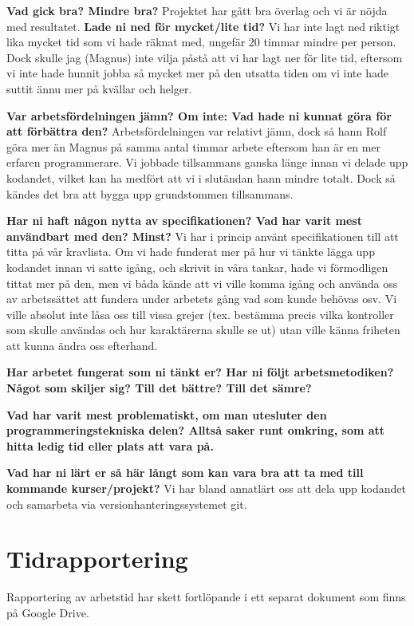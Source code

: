 \documentclass{scrartcl}
\begin{document}
\textbf{Vad gick bra? Mindre bra?}
Projektet har gått bra överlag och vi är nöjda med resultatet.  
\textbf{Lade ni ned för mycket/lite tid?}
Vi har inte lagt ned riktigt lika mycket tid som vi hade räknat med, ungefär 20 timmar mindre per person. Dock skulle jag (Magnus) inte vilja påstå att vi har lagt ner för lite tid, eftersom vi inte hade hunnit jobba så mycket mer på den utsatta tiden om vi inte hade suttit ännu mer på kvällar och helger.

\textbf{Var arbetsfördelningen jämn? Om inte: Vad hade ni kunnat göra för att förbättra den?}
Arbetsfördelningen var relativt jämn, dock så hann Rolf göra mer än Magnus på samma antal timmar arbete eftersom han är en mer erfaren programmerare. Vi jobbade tillsammans ganska länge innan vi delade upp kodandet, vilket kan ha medfört att vi i slutändan hann mindre totalt. Dock så kändes det bra att bygga upp grundstommen tillsammans. 

\textbf{Har ni haft någon nytta av specifikationen? Vad har varit mest användbart med den? Minst?}
Vi har i princip använt specifikationen till att titta på vår kravlista. Om vi hade funderat mer på hur vi tänkte lägga upp kodandet innan vi satte igång, och skrivit in våra tankar, hade vi förmodligen tittat mer på den, men vi båda kände att vi ville komma igång och använda oss av arbetssättet att fundera under arbetets gång vad som kunde behövas osv. Vi ville absolut inte låsa oss till vissa grejer (tex. bestämma precis vilka kontroller som skulle användas och hur karaktärerna skulle se ut) utan ville känna friheten att kunna ändra oss efterhand. 

\textbf{Har arbetet fungerat som ni tänkt er? Har ni följt arbetsmetodiken? Något som skiljer sig? Till det bättre? Till det sämre?}



\textbf{Vad har varit mest problematiskt, om man utesluter den programmeringstekniska delen? Alltså saker runt omkring, som att hitta ledig tid eller plats att vara på.}

\textbf{Vad har ni lärt er så här långt som kan vara bra att ta med till kommande kurser/projekt?} Vi har bland annatlärt oss att dela upp kodandet och samarbeta via versionhanteringssystemet git.

\section{Tidrapportering}
Rapportering av arbetstid har skett fortlöpande i ett separat dokument som finns på Google Drive.
\end{document}
